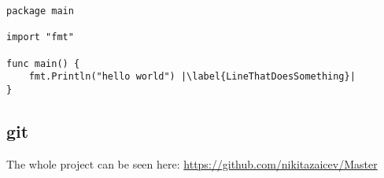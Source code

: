 \begin{lstlisting}[caption={Hello world in Golang},label=ListingGolang,escapechar=|]
package main

import "fmt"

func main() {
    fmt.Println("hello world") |\label{LineThatDoesSomething}|
}

\end{lstlisting}

\subsection{\gls{git}}

The whole project can be seen here: \url{https://github.com/nikitazaicev/Master}